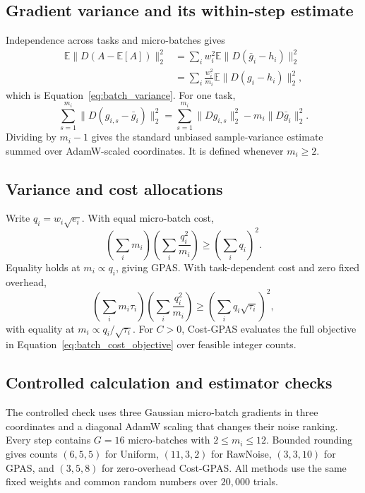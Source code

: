 \subsection{Gradient variance and its within-step estimate}
\label{app:variance}

Independence across tasks and micro-batches gives
\begin{align}
\mathbb E\|D(A-\mathbb E[A])\|_2^2
&=\sum_iw_i^2\mathbb E\|D(\bar g_i-h_i)\|_2^2 \\
&=\sum_i\frac{w_i^2}{m_i}
  \mathbb E\|D(g_i-h_i)\|_2^2,
\end{align}
which is Equation~\ref{eq:batch_variance}. For one task,
\begin{equation}
\sum_{s=1}^{m_i}\|D(g_{i,s}-\bar g_i)\|_2^2
=\sum_{s=1}^{m_i}\|Dg_{i,s}\|_2^2-m_i\|D\bar g_i\|_2^2.
\end{equation}
Dividing by $m_i-1$ gives the standard unbiased sample-variance estimate summed
over AdamW-scaled coordinates. It is defined whenever $m_i\geq2$.

\subsection{Variance and cost allocations}
\label{app:allocation_proofs}

Write $q_i=w_i\sqrt{e_i}$. With equal micro-batch cost,
\begin{equation}
\left(\sum_i m_i\right)\left(\sum_i\frac{q_i^2}{m_i}\right)
\geq\left(\sum_i q_i\right)^2.
\end{equation}
Equality holds at $m_i\propto q_i$, giving GPAS. With task-dependent cost and
zero fixed overhead,
\begin{equation}
\left(\sum_i m_i\tau_i\right)
\left(\sum_i\frac{q_i^2}{m_i}\right)
\geq\left(\sum_i q_i\sqrt{\tau_i}\right)^2,
\end{equation}
with equality at $m_i\propto q_i/\sqrt{\tau_i}$. For $C>0$, Cost-GPAS evaluates
the full objective in Equation~\ref{eq:batch_cost_objective} over feasible
integer counts.

\subsection{Controlled calculation and estimator checks}
\label{app:controlled}

The controlled check uses three Gaussian micro-batch gradients in three
coordinates and a diagonal AdamW scaling that changes their noise ranking.
Every step contains $G=16$ micro-batches with $2\leq m_i\leq12$. Bounded
rounding gives counts $(6,5,5)$ for Uniform, $(11,3,2)$ for RawNoise,
$(3,3,10)$ for GPAS, and $(3,5,8)$ for zero-overhead Cost-GPAS. All methods use
the same fixed weights and common random numbers over $20{,}000$ trials.

